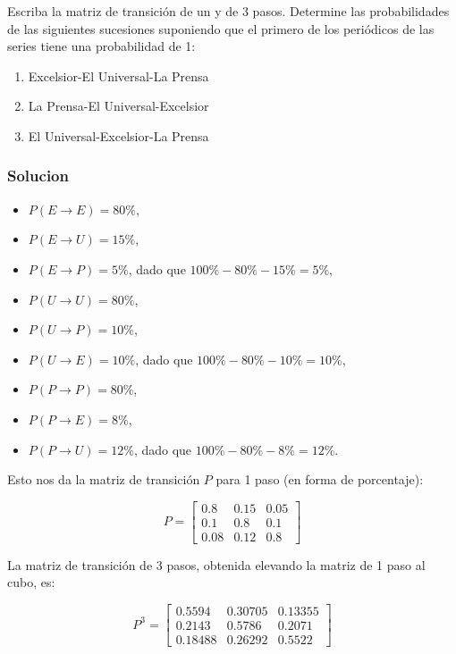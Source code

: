 \documentclass{article}
\begin{document}
Escriba la matriz de transición de un y de 3 pasos. Determine las probabilidades de las siguientes sucesiones suponiendo que el primero de los periódicos de las series tiene una probabilidad de 1:

\begin{enumerate}
    \item Excelsior-El Universal-La Prensa
    \item La Prensa-El Universal-Excelsior
    \item El Universal-Excelsior-La Prensa
\end{enumerate}

\subsubsection*{Solucion}

\begin{itemize}
    \item $P(E \rightarrow E) = 80\%$,
    \item $P(E \rightarrow U) = 15\%$,
    \item $P(E \rightarrow P) = 5\%$, dado que $100\% - 80\% - 15\% = 5\%$,
    \item $P(U \rightarrow U) = 80\%$,
    \item $P(U \rightarrow P) = 10\%$,
    \item $P(U \rightarrow E) = 10\%$, dado que $100\% - 80\% - 10\% = 10\%$,
    \item $P(P \rightarrow P) = 80\%$,
    \item $P(P \rightarrow E) = 8\%$,
    \item $P(P \rightarrow U) = 12\%$, dado que $100\% - 80\% - 8\% = 12\%$.
\end{itemize}

Esto nos da la matriz de transición \(P\) para 1 paso (en forma de porcentaje):

\[ P = \begin{bmatrix} 0.8 & 0.15 & 0.05 \\ 0.1 & 0.8 & 0.1 \\ 0.08 & 0.12 & 0.8 \end{bmatrix} \]

La matriz de transición de 3 pasos, obtenida elevando la matriz de 1 paso al cubo, es:

\[ P^3 = \begin{bmatrix} 0.5594 & 0.30705 & 0.13355 \\ 0.2143 & 0.5786 & 0.2071 \\ 0.18488 & 0.26292 & 0.5522 \end{bmatrix} \]
\end{document}
